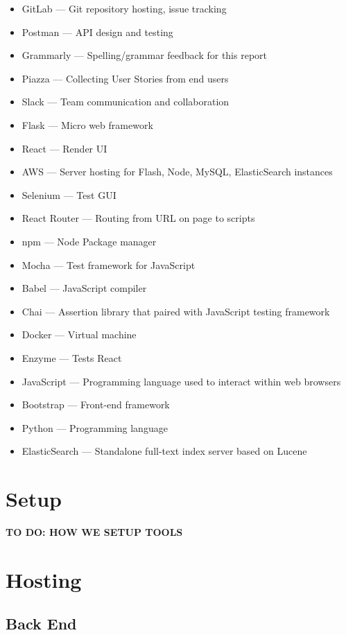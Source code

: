 \documentclass[12pt]{article}
\begin{document}
\begin{itemize}
	\item GitLab		--- Git repository hosting, issue tracking
	\item Postman		--- API design and testing %
	\item Grammarly		--- Spelling/grammar feedback for this report
	\item Piazza		--- Collecting User Stories from end users
	\item Slack			--- Team communication and collaboration
	\item Flask     	--- Micro web framework
	\item React     	--- Render UI
	\item AWS       	--- Server hosting for Flash, Node, MySQL, ElasticSearch instances
	\item Selenium 		--- Test GUI
	\item React Router 	--- Routing from URL on page to scripts
	\item npm 			--- Node Package manager
	\item Mocha 		--- Test framework for JavaScript
	\item Babel 		--- JavaScript compiler
	\item Chai 			--- Assertion library that paired with JavaScript testing framework
	\item Docker 		--- Virtual machine
	\item Enzyme 		--- Tests React
	\item JavaScript 	--- Programming language used to interact within web browsers
	\item Bootstrap 	--- Front-end framework
	\item Python 		--- Programming language
	\item ElasticSearch --- Standalone full-text index server based on Lucene

\end{itemize}

\section{Setup}

\textbf{TO DO: HOW WE SETUP TOOLS}

\section{Hosting}

\subsection{Back End}
\end{document}
